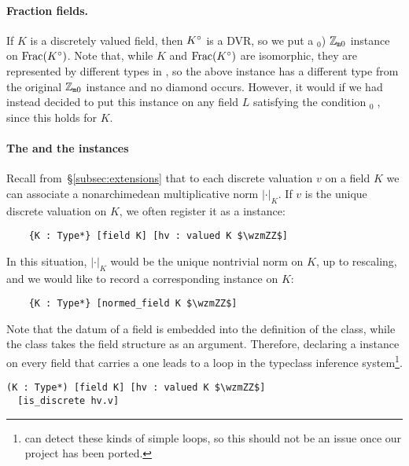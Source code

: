 \documentclass[sigplan,10pt, nonacm, review]{acmart}
\begin{document}
\paragraph{Fraction fields.}
If $K$ is a discretely valued field, then ${K}^\circ$ is a DVR, so we put a \code{[valued (fraction_ring K}$_0$) $\mathbb{Z}_{\mathtt{m}0}$\code{]} instance on $\operatorname{Frac}({K}^\circ)$\href{https://github.com/LCFT-Lean/local_fields/blob/76ad487d09babdb0018f394a5634526637ee014a/src/discrete_valuation_ring/basic.lean#L452}{\extlink}. Note that, while $K$ and $\operatorname{Frac}({K}^\circ)$ are isomorphic, they are represented by different types in \mathlib, so the above  instance has a different type from the original \code{[valued K} $\mathbb{Z}_{\mathtt{m}0}$\code{]} instance and no diamond occurs. However, it would if we had instead decided to put this  instance on any field $L$ satisfying the condition \code{[is_fraction_ring K}$_0\; $\code{L]}, since this holds for $K$.

\paragraph{The  and the  instances}
Recall from~\S\ref{subsec:extensions} that to each discrete valuation $v$ on a field $K$ we can associate a nonarchimedean multiplicative norm $\lvert\cdot\rvert_K$. If $v$ is the unique discrete valuation on $K$, we often register it as a  instance:
\begin{lstlisting}
    {K : Type*} [field K] [hv : valued K $\wzmZZ$] 
\end{lstlisting}
In this situation, $\lvert\cdot\rvert_K$ would be the unique nontrivial norm on $K$, up to rescaling, and we would like to record a corresponding  instance on $K$:
\begin{lstlisting}
    {K : Type*} [normed_field K $\wzmZZ$] 
\end{lstlisting}
Note that the datum of a field is embedded into the definition of the  class, while the class  takes the field structure as an argument. Therefore, declaring a  instance on every field that carries a  one leads to a loop in the typeclass inference system\footnote{\lean[4] can detect these kinds of simple loops, so this should not be an issue once our project has been ported.}.

    
\begin{lstlisting}
(K : Type*) [field K] [hv : valued K $\wzmZZ$]
  [is_discrete hv.v]
\end{lstlisting}
  
\end{document}
